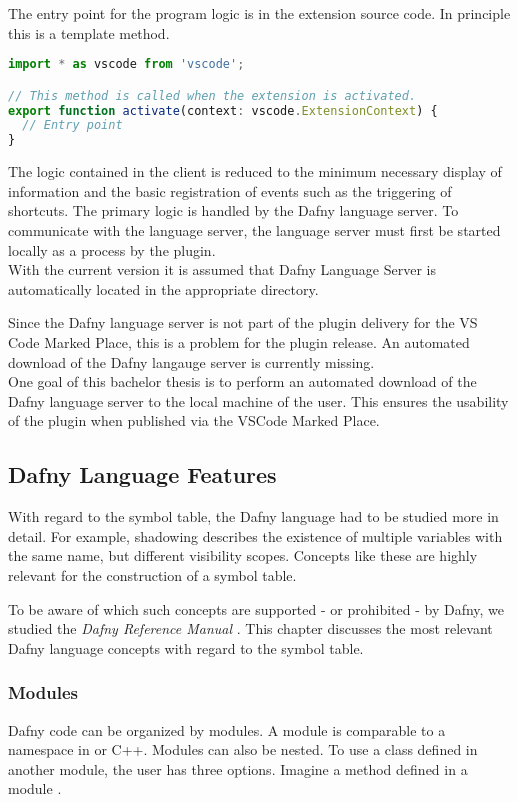 The entry point for the program logic is in the extension source code.
In principle this is a template method.

\begin{lstlisting}[language=typescript, caption={extension.ts}, captionpos=b, label={lst:extension-file}]
import * as vscode from 'vscode';

// This method is called when the extension is activated.
export function activate(context: vscode.ExtensionContext) {
  // Entry point
}
\end{lstlisting}

The logic contained in the client is reduced to the minimum necessary display of
information and the basic registration of events such as the triggering of shortcuts.
The primary logic is handled by the Dafny language server.
To communicate with the language server, the language server must first be started locally as a process by the plugin. \\

With the current version it is assumed that Dafny Language Server is automatically located in the appropriate directory.

Since the Dafny language server is not part of the plugin delivery for the VS Code Marked Place,
this is a problem for the plugin release.
An automated download of the Dafny langauge server is currently missing. \\

One goal of this bachelor thesis is to perform an automated download of the Dafny language server to the local machine of the user.
This ensures the usability of the plugin when published via the VSCode Marked Place.


\subsection{Dafny Language Features}
With regard to the symbol table, the Dafny language had to be studied more in detail.
For example, shadowing describes the existence of multiple variables with the same name, but different visibility scopes.
Concepts like these are highly relevant for the construction of a symbol table.

To be aware of which such concepts are supported - or prohibited - by Dafny, we studied the \textit{Dafny Reference Manual} \cite{dafnyReferenceManual}.
This chapter discusses the most relevant Dafny language concepts with regard to the symbol table.


\subsubsection{Modules}
Dafny code can be organized by modules.
A module is comparable to a namespace in \CsharpWithSpace or C++.
Modules can also be nested.
To use a class defined in another module, the user has three options.
Imagine a method  defined in a module .

